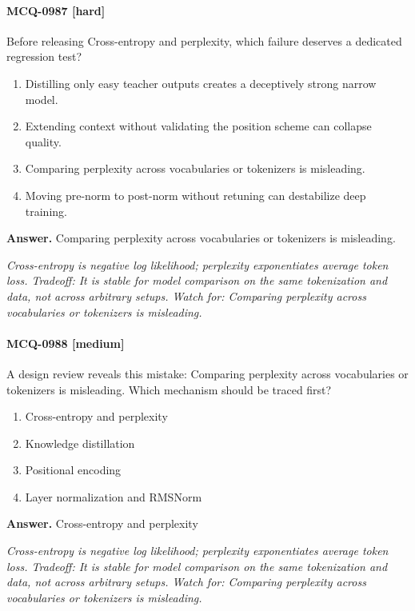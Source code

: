\paragraph{MCQ-0987 [hard]} Before releasing Cross-entropy and perplexity, which failure deserves a dedicated regression test?
\begin{enumerate}[label=\Alph*.]
\item Distilling only easy teacher outputs creates a deceptively strong narrow model.
\item Extending context without validating the position scheme can collapse quality.
\item Comparing perplexity across vocabularies or tokenizers is misleading.
\item Moving pre-norm to post-norm without retuning can destabilize deep training.
\end{enumerate}
\noindent\textbf{Answer.} Comparing perplexity across vocabularies or tokenizers is misleading.
\par\textit{Cross-entropy is negative log likelihood; perplexity exponentiates average token loss. Tradeoff: It is stable for model comparison on the same tokenization and data, not across arbitrary setups. Watch for: Comparing perplexity across vocabularies or tokenizers is misleading.}
\paragraph{MCQ-0988 [medium]} A design review reveals this mistake: Comparing perplexity across vocabularies or tokenizers is misleading. Which mechanism should be traced first?
\begin{enumerate}[label=\Alph*.]
\item Cross-entropy and perplexity
\item Knowledge distillation
\item Positional encoding
\item Layer normalization and RMSNorm
\end{enumerate}
\noindent\textbf{Answer.} Cross-entropy and perplexity
\par\textit{Cross-entropy is negative log likelihood; perplexity exponentiates average token loss. Tradeoff: It is stable for model comparison on the same tokenization and data, not across arbitrary setups. Watch for: Comparing perplexity across vocabularies or tokenizers is misleading.}
